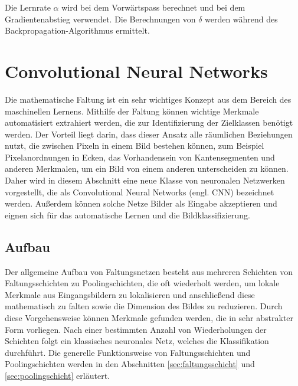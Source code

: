 Die Lernrate $\alpha$ wird bei dem Vorwärtspass berechnet und bei dem Gradientenabstieg verwendet. Die Berechnungen von $\delta$ werden während des Backpropagation-Algorithmus ermittelt. 





\section{Convolutional Neural Networks}

Die mathematische Faltung ist ein sehr wichtiges Konzept aus dem Bereich des maschinellen Lernens. Mithilfe der Faltung können wichtige Merkmale automatisiert extrahiert werden, die zur Identifizierung der Zielklassen benötigt werden\cite{IntroML}. Der Vorteil liegt darin, dass dieser Ansatz alle räumlichen Beziehungen nutzt, die zwischen Pixeln in einem Bild bestehen können, zum Beispiel Pixelanordnungen in Ecken, das Vorhandensein von Kantensegmenten und anderen Merkmalen, um ein Bild von einem anderen unterscheiden zu können. Daher wird in diesem Abschnitt eine neue Klasse von neuronalen Netzwerken vorgestellt, die als Convolutional Neural Networks (engl. CNN) bezeichnet werden. Außerdem können solche Netze Bilder als Eingabe akzeptieren und eignen sich für das automatische Lernen und die Bildklassifizierung\cite{Gonzalez2018}.

\subsection{Aufbau}

Der allgemeine Aufbau von Faltungsnetzen\cite{Gonzalez2018, IntroML} besteht aus mehreren Schichten von Faltungsschichten zu Poolingschichten, die oft wiederholt werden, um lokale Merkmale aus Eingangsbildern zu lokalisieren und anschließend diese mathematisch zu falten sowie die Dimension des Bildes zu reduzieren. Durch diese Vorgehensweise können Merkmale gefunden werden, die in sehr abstrakter Form vorliegen. Nach einer bestimmten Anzahl von Wiederholungen der Schichten folgt ein klassisches neuronales Netz, welches die Klassifikation durchführt. Die generelle Funktionsweise von Faltungsschichten und Poolingschichten werden in den Abschnitten \ref{sec:faltungsschicht} und \ref{sec:poolingschicht} erläutert. 

